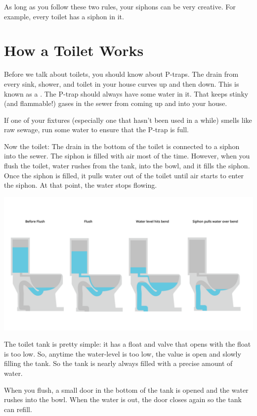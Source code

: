 As long as you follow these two rules,  your siphons can be very creative.  For example,  every toilet has a siphon in it.

\section{How a Toilet Works}

Before we talk about toilets,  you should know about P-traps.  The drain from every sink, shower, 
and toilet in your house curves up and then down.  This is known as a .   
The P-trap should always have some water in it.  That keeps stinky (and flammable!) gases 
in the sewer from coming up and into your house.  

If one of your fixtures (especially one that hasn't been used in a while) smells like raw sewage,  run
some water to ensure that the P-trap is full.

Now the toilet:  The drain in the bottom of the toilet is connected to a siphon into the sewer.   The siphon is filled with air most of the time.  However, when you flush the toilet,  water rushes from the tank, into the bowl,  and it fills the siphon.  Once the siphon is filled,  it pulls water out of the toilet until air starts to enter the siphon.  At that point,  the water stops flowing.

\includegraphics[width=\textwidth]{toilet.png}


The toilet tank is pretty simple: it has a float and valve that opens with the float is too low.   So, anytime the water-level is too low,  the value is open and slowly filling the tank.   So the tank is nearly always filled with a precise amount of water.

When you flush,  a small door in the bottom of the tank is opened and the water rushes into the bowl.  When the water is out,  the door closes again so the tank can refill.
